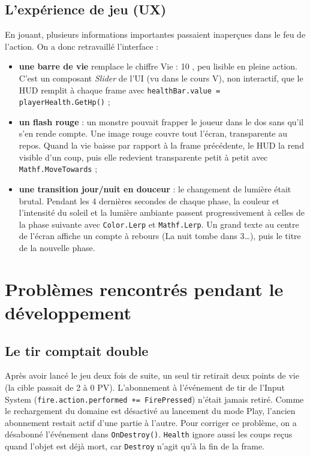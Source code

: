 \documentclass[11pt,a4paper]{article}
\begin{document}
\subsection{L'expérience de jeu (UX)}
En jouant, plusieurs informations importantes passaient inaperçues dans le feu de l'action. On a donc retravaillé l'interface :
\begin{itemize}
  \item \textbf{une barre de vie} remplace le chiffre \og Vie : 10 \fg{}, peu lisible en pleine action. C'est un composant \emph{Slider} de l'UI (vu dans le cours V), non interactif, que le HUD remplit à chaque frame avec \texttt{healthBar.value = playerHealth.GetHp()} ;
  \item \textbf{un flash rouge} : un monstre pouvait frapper le joueur dans le dos sans qu'il s'en rende compte. Une image rouge couvre tout l'écran, transparente au repos. Quand la vie baisse par rapport à la frame précédente, le HUD la rend visible d'un coup, puis elle redevient transparente petit à petit avec \texttt{Mathf.MoveTowards} ;
  \item \textbf{une transition jour/nuit en douceur} : le changement de lumière était brutal. Pendant les 4 dernières secondes de chaque phase, la couleur et l'intensité du soleil et la lumière ambiante passent progressivement à celles de la phase suivante avec \texttt{Color.Lerp} et \texttt{Mathf.Lerp}. Un grand texte au centre de l'écran affiche un compte à rebours (\og La nuit tombe dans 3\ldots \fg{}), puis le titre de la nouvelle phase.
\end{itemize}

\section{Problèmes rencontrés pendant le développement}

\subsection{Le tir comptait double}
Après avoir lancé le jeu deux fois de suite, un seul tir retirait deux points de vie (la cible passait de 2 à 0 PV). L'abonnement à l'événement de tir de l'Input System (\texttt{fire.action.performed += FirePressed}) n'était jamais retiré. Comme le rechargement du domaine est désactivé au lancement du mode Play, l'ancien abonnement restait actif d'une partie à l'autre. Pour corriger ce problème, on a désabonné l'événement dans \texttt{OnDestroy()}. \texttt{Health} ignore aussi les coups reçus quand l'objet est déjà mort, car \texttt{Destroy} n'agit qu'à la fin de la frame.
\end{document}
